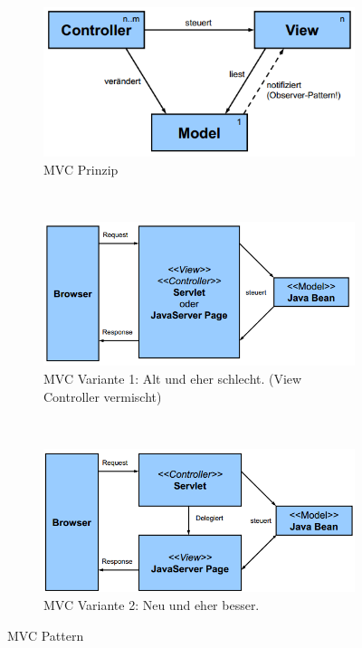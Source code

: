 \begin{figure}[h!]
	\centering
	\begin{subfigure}[b]{0.3\textwidth}
		\includegraphics[width=\textwidth]{fig/mvc}
		\caption{MVC Prinzip}
		\label{fig:mvc}
	\end{subfigure}
	~
	\begin{subfigure}[b]{0.3\textwidth}
		\includegraphics[width=\textwidth]{fig/mvc-web-1}
		\caption{MVC Variante 1: Alt und eher schlecht. (View Controller vermischt)}
		\label{fig:mvc-web-1}
	\end{subfigure}
	~
	\begin{subfigure}[b]{0.3\textwidth}
		\includegraphics[width=\textwidth]{fig/mvc-web-2}
		\caption{MVC Variante 2: Neu und eher besser.}
		\label{fig:mvc-web-2}
	\end{subfigure}
	\caption{MVC Pattern}\label{fig:mvc-pattern}
\end{figure}

